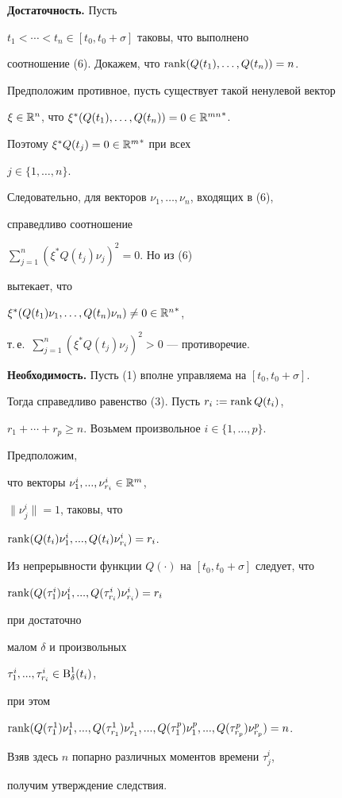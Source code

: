 \begin{pf} {\bf Достаточность.} Пусть


$t_{1}<\dotsb<t_{n}\in [t_0,t_0+\sigma]$ таковы, что выполнено


соотношение (6). Докажем, что $\operatorname{rank}(Q(t_{1}),\dotsc,Q(t_{n}))=n$.


Предположим противное, пусть существует такой ненулевой вектор


$\xi\in\Bbb R^n$, что $\xi^{*}(Q(t_{1}),\dotsc,Q(t_{n}))=0\in{\Bbb R^{mn}}^{*}$.


Поэтому $\xi^{*}Q(t_{j})=0\in{\Bbb R^{m}}^{*}$ при всех


$j\in\{1,\dotsc,n\}$.


Следовательно, для векторов $\nu_{1},\dotsc,\nu_{n}$, входящих в (6),


справедливо соотношение


$\sum\limits_{j=1}^{n}(\xi^{*}Q(t_{j})\nu_{j})^{2}=0$. Но из (6)


вытекает, что


$\xi^{*}(Q(t_{1})\nu_{1},\dotsc,Q(t_{n})\nu_{n})\ne 0\in {\Bbb


R^{n}}^{*}$,


т.\,е.~$\sum\limits_{j=1}^{n}(\xi^{*}Q(t_{j})\nu_{j})^{2}>0$ --- противоречие.


\medskip





{\bf Необходимость.} Пусть (1) вполне управляема на $[t_0,t_0+\sigma]$.


Тогда справедливо равенство (3). Пусть $r_{i}:=\operatorname{rank} Q(t_{i})$,


$r_{1}+\dotsb+r_{p}\ge n$. Возьмем произвольное $i\in\{1,\dotsc,p\}$.


Предположим,


что векторы $\nu^{i}_{1},...,\nu^{i}_{r_{i}}\in\Bbb R^m$,


$\|\nu^{i}_{j}\|=1$, таковы, что


$\operatorname{rank}(Q(t_{i})\nu^{i}_{1},...,Q(t_{i})\nu^{i}_{r_{i}})=r_{i}$.


Из непрерывности функции $Q(\cdot)$ на $[t_0,t_0+\sigma]$ следует, что


$\rank(Q(\tau^{i}_{1})\nu^{i}_{1},...,


Q(\tau^{i}_{r_{i}})\nu^{i}_{r_{i}})=r_{i}$


при достаточно


малом $\delta$ и произвольных


$\tau^{i}_{1},...,\tau^{i}_{r_{i}}\in\operatorname{B}_{\delta}^{1}(t_{i})$,


при этом


$\rank(Q(\tau^{1}_{1})\nu^{1}_{1},...,


Q(\tau^{1}_{r_{1}})\nu^{1}_{r_{1}},...,


Q(\tau^{p}_{1})\nu^{p}_{1},...,


Q(\tau^{p}_{r_{p}})\nu^{p}_{r_{p}})=n$.


Взяв здесь $n$ попарно различных моментов времени $\tau^{i}_{j}$,


получим утверждение следствия.


\end{pf}
